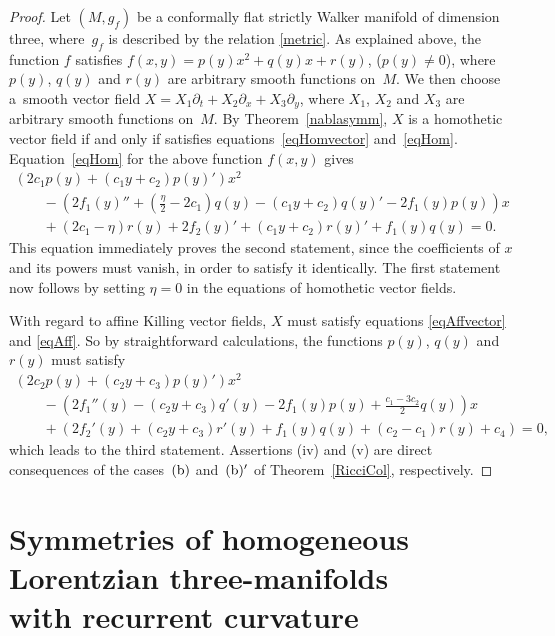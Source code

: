 \documentclass[10pt,a4paper]{amsart}
\numberwithin{equation}{section}
\begin{document}
\begin{proof}
Let $(M,g_f)$ be a conformally f\/lat strictly Walker manifold of dimension three, where~$g_f$ is described by the relation \eqref{metric}. As explained above, the function $f$ satisf\/ies $f(x,y)=p(y)x^2+q(y)x+r(y)$, ($p(y)\neq 0$), where $p(y)$, $q(y)$ and $r(y)$ are arbitrary smooth functions on~$M$. We then choose a~smooth vector f\/ield $X=X_1\partial_t+X_2\partial_x+X_3\partial_y$, where $X_1$, $X_2$ and $X_3$ are arbitrary smooth functions on~$M$. By Theorem~\ref{nablasymm}, $X$ is a homothetic vector f\/ield if and only if satisf\/ies equations~\eqref{eqHomvector} and~\eqref{eqHom}. Equation~\eqref{eqHom} for the above function $f(x,y)$ gives
\begin{gather*}
\left(2c_1p(y)+(c_1y+c_2)p(y)'\right)x^2 \\
\qquad {} -\left(2f_1(y)''+\left(\frac{\eta}{2}-2c_1\right)q(y)-(c_1y+c_2)q(y)'-2f_1(y)p(y)\right)x\\
\qquad{} +(2c_1-\eta)r(y)+2f_2(y)'+(c_1y+c_2)r(y)'+f_1(y)q(y)=0.
\end{gather*}
This equation immediately proves the second statement, since the coef\/f\/icients of $x$ and {its powers must vanish, in order to satisfy it identically. The f\/irst statement now follows by} {setting} $\eta=0$ in the equations of homothetic vector f\/ields.

With regard to af\/f\/ine Killing vector f\/ields, $X$ must satisfy equations \eqref{eqAffvector} and \eqref{eqAff}. So by straightforward calculations, the functions $p(y)$, $q(y)$ and $r(y)$ must satisfy
\begin{gather*}
\left(2c_2p(y)+(c_2y+c_3)p(y)'\right)x^2\\
\qquad{}-\left(2f_1 ''(y)-(c_2y+c_3)q'(y)-2f_1(y)p(y)+\frac{c_1-3c_2}{2}q(y)\right)x\\
\qquad{}+\left(2f_2 '(y)+(c_2y+c_3)r'(y)+f_1(y)q(y)+(c_2-c_1)r(y)+c_4\right)=0,
\end{gather*}
which {leads to} the third statement. Assertions (iv) and (v) are direct consequences of the cases~${\rm (b)}$ and~${\rm (b)'}$ of Theorem~\ref{RicciCol}, respectively.
\end{proof}

\section[Symmetries of homogeneous Lorentzian three-manifolds with recurrent curvature]{Symmetries of homogeneous Lorentzian three-manifolds \\ with recurrent curvature}\label{section4}
\end{document}
